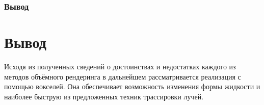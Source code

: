 \subsubsection{Вывод}


\section{Вывод}

Исходя из полученных сведений о достоинствах и недостатках каждого из методов объёмного
рендеринга в дальнейшем рассматривается реализация с помощью вокселей. Она обеспечивает
возможность изменения формы жидкости и наиболее быструю из предложенных техник трассировки лучей.

